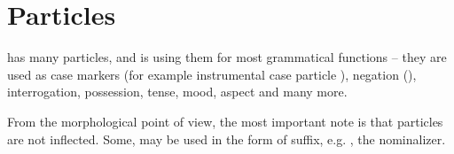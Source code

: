 
\section{Particles}

\andro has many particles, and is using them for most grammatical functions --
they are used as case markers (for example instrumental case particle
), negation (), interrogation, possession, tense, mood,
aspect and many more.

From the morphological point of view, the most important note is that particles
are not inflected. Some, may be used in the form of suffix, e.g. ,
the nominalizer.
